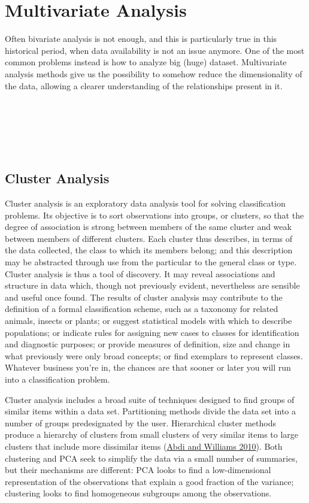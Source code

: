 \documentclass[
]{svmono}
\begin{document}
\newpage

\hypertarget{multivariate-analysis}{%
\chapter{Multivariate Analysis}\label{multivariate-analysis}}

Often bivariate analysis is not enough, and this is particularly true in
this historical period, when data availability is not an issue anymore.
One of the most common problems instead is how to analyze big (huge)
dataset. Multivariate analysis methods give us the possibility to
somehow reduce the dimensionality of the data, allowing a clearer
understanding of the relationships present in it.

~

~

~

\hypertarget{cluster-analysis}{%
\section{Cluster Analysis}\label{cluster-analysis}}

Cluster analysis is an exploratory data analysis tool for solving
classification problems. Its objective is to sort observations into
groups, or clusters, so that the degree of association is strong between
members of the same cluster and weak between members of different
clusters. Each cluster thus describes, in terms of the data collected,
the class to which its members belong; and this description may be
abstracted through use from the particular to the general class or type.
Cluster analysis is thus a tool of discovery. It may reveal associations
and structure in data which, though not previously evident, nevertheless
are sensible and useful once found. The results of cluster analysis may
contribute to the definition of a formal classification scheme, such as
a taxonomy for related animals, insects or plants; or suggest
statistical models with which to describe populations; or indicate rules
for assigning new cases to classes for identification and diagnostic
purposes; or provide measures of definition, size and change in what
previously were only broad concepts; or find exemplars to represent
classes. Whatever business you're in, the chances are that sooner or
later you will run into a classification problem.

Cluster analysis includes a broad suite of techniques designed to find
groups of similar items within a data set. Partitioning methods divide
the data set into a number of groups predesignated by the user.
Hierarchical cluster methods produce a hierarchy of clusters from small
clusters of very similar items to large clusters that include more
dissimilar items (\protect\hyperlink{ref-abdi2010}{Abdi and Williams 2010}). Both clustering and PCA seek to simplify
the data via a small number of summaries, but their mechanisms are
different: PCA looks to find a low-dimensional representation of the
observations that explain a good fraction of the variance; clustering
looks to find homogeneous subgroups among the observations.
\end{document}
